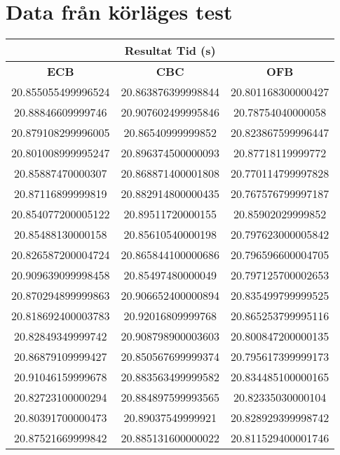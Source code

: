 \section{Data från körläges test}
\label{app:raw-data-mode}

\begin{table}[H]
    \centering
    \begin{tabular}{ ||c|c|c|| }
      \hline
      \multicolumn{3}{|c|}{\bfseries{Resultat Tid (s)}} \\
      \hline
      \bfseries{ECB} & \bfseries{CBC} & \bfseries{OFB} \\
      \hline
      20.855055499996524 & 20.863876399998844 & 20.801168300000427 \\
      20.88846609999746 & 20.907602499995846 & 20.78754040000058 \\
      20.879108299996005 & 20.86540999999852 & 20.823867599996447 \\
      20.801008999995247 & 20.896374500000093 & 20.87718119999772 \\
      20.85887470000307 & 20.868871400001808 & 20.770114799997828 \\
      20.87116899999819 & 20.882914800000435 & 20.767576799997187 \\
      20.854077200005122 & 20.89511720000155 & 20.85902029999852 \\
      20.85488130000158 & 20.85610540000198 & 20.797623000005842 \\
      20.826587200004724 & 20.865844100000686 & 20.796596600004705 \\
      20.909639099998458 & 20.85497480000049 & 20.797125700002653 \\
      20.870294899999863 & 20.906652400000894 & 20.835499799999525 \\
      20.818692400003783 & 20.92016809999768 & 20.865253799995116 \\
      20.82849349999742 & 20.908798900003603 & 20.800847200000135 \\
      20.86879109999427 & 20.850567699999374 & 20.795617399999173 \\
      20.91046159999678 & 20.883563499999582 & 20.834485100000165 \\
      20.82723100000294 & 20.884897599993565 & 20.82335030000104 \\
      20.80391700000473 & 20.89037549999921 & 20.828929399998742 \\
      20.87521669999842 & 20.885131600000022 & 20.811529400001746 \\

\end{tabular}
\end{table}
